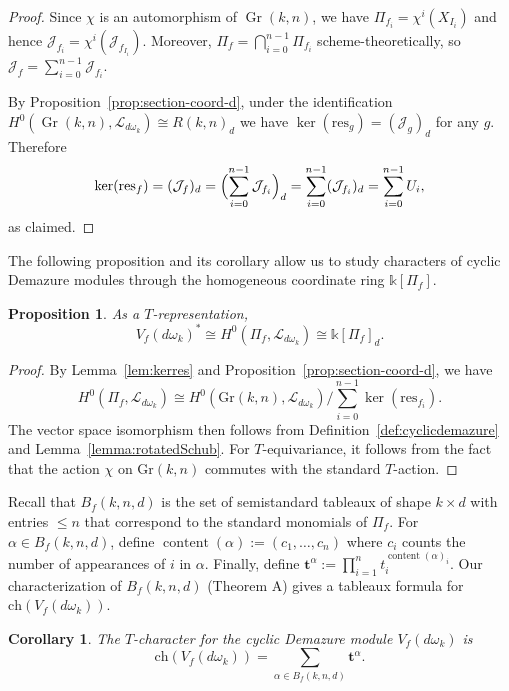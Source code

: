 \documentclass[12pt,reqno]{amsart}
\newtheorem{prop}[lemma]{Proposition}
\newtheorem{cor}[lemma]{Corollary}
\theoremstyle{definition}
\renewcommand{\k}{\mathbb{k}}
\newcommand{\cJ}{\mathcal{J}}
\newcommand{\res}{\mathrm{res}}
\newcommand{\ch}{\mathrm{ch}}
\newcommand{\gr}{\mathrm{Gr}}
\newcommand{\content}{\operatorname{content}}
\newcommand{\Gr}{\operatorname{Gr}}
\begin{document}
{\begin{proof}
Since $\chi$ is an automorphism of $\Gr(k,n)$, we have
$\Pi_{f_i}=\chi^i(X_{I_i})$ and hence $\cJ_{f_i}=\chi^i(\cJ_{f_{I_i}})$.
Moreover, $\Pi_f=\bigcap_{i=0}^{n-1}\Pi_{f_i}$ scheme-theoretically, so
$\cJ_f=\sum_{i=0}^{n-1}\cJ_{f_i}$.

By Proposition~\ref{prop:section-coord-d}, under the identification
$H^0(\Gr(k,n),\mathcal{L}_{d\omega_k})\cong R(k,n)_d$ we have
$\ker(\res_g)=(\cJ_g)_d$ for any $g$. Therefore
\[
\ker(\res_f)=(\cJ_f)_d=\Bigl(\sum_{i=0}^{n-1}\cJ_{f_i}\Bigr)_d
=\sum_{i=0}^{n-1}(\cJ_{f_i})_d=\sum_{i=0}^{n-1}U_i,
\]
as claimed.
\end{proof}



The following proposition and its corollary allow us to study characters of cyclic Demazure modules through the homogeneous coordinate ring $\k[\Pi_f]$.
\begin{prop}
\label{prop:coord-ring-id}
    As a $T$-representation, 
    \[V_f(d\omega_k)^*\cong H^0(\Pi_f,\mathcal{L}_{d\omega_k})\cong \k[\Pi_f]_d.\]
\end{prop}

\begin{proof}
    By Lemma~\ref{lem:kerres} and Proposition~\ref{prop:section-coord-d}, we have \[H^0(\Pi_f,\mathcal{L}_{d\omega_k})\cong H^0(\gr(k,n), \mathcal{L}_{d\omega_k})/\sum_{i=0}^{n-1}\ker(\res_{f_i}).\] 
    The vector space isomorphism then follows from Definition~\ref{def:cyclicdemazure} and Lemma~\ref{lemma:rotatedSchub}. For $T$-equivariance, it follows from the fact that the action $\chi$ on $\gr(k,n)$ commutes with the standard $T$-action. 
\end{proof} 
Recall that $B_f(k,n,d)$ is the set of semistandard tableaux of shape $k\times d$ with entries $\le n$ that correspond to the standard monomials of $\Pi_f$. For $\alpha\in B_f(k,n,d)$, define $\content(\alpha):=(c_1,\dots,c_n)$ where $c_i$ counts the number of appearances of $i$ in $\alpha$. Finally, define $\mathbf{t}^\alpha:=\prod_{i=1}^n t_i^{\content(\alpha)_i}$. Our characterization of $B_f(k,n,d)$ (Theorem A) gives a tableaux formula for $\ch(V_f(d\omega_k))$.

\begin{cor}
    The $T$-character for the cyclic Demazure module $V_f(d\omega_k)$
    is 
    \[\ch(V_f(d\omega_k))=\sum_{\alpha\in B_f(k,n,d)} \mathbf{t}^\alpha.\]
\end{cor}



}
\end{document}
